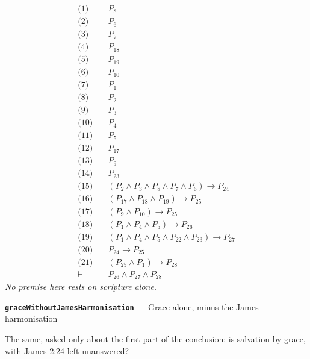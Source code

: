 \documentclass[11pt]{article}
\begin{document}
\begin{align*}
  \text{(1)} \quad & P_{8} \\
  \text{(2)} \quad & P_{6} \\
  \text{(3)} \quad & P_{7} \\
  \text{(4)} \quad & P_{18} \\
  \text{(5)} \quad & P_{19} \\
  \text{(6)} \quad & P_{10} \\
  \text{(7)} \quad & P_{1} \\
  \text{(8)} \quad & P_{2} \\
  \text{(9)} \quad & P_{3} \\
  \text{(10)} \quad & P_{4} \\
  \text{(11)} \quad & P_{5} \\
  \text{(12)} \quad & P_{17} \\
  \text{(13)} \quad & P_{9} \\
  \text{(14)} \quad & P_{23} \\
  \text{(15)} \quad & (P_{2} \land P_{3} \land P_{8} \land P_{7} \land P_{6}) \rightarrow P_{24} \\
  \text{(16)} \quad & (P_{17} \land P_{18} \land P_{19}) \rightarrow P_{25} \\
  \text{(17)} \quad & (P_{9} \land P_{10}) \rightarrow P_{25} \\
  \text{(18)} \quad & (P_{1} \land P_{4} \land P_{5}) \rightarrow P_{26} \\
  \text{(19)} \quad & (P_{1} \land P_{4} \land P_{5} \land P_{22} \land P_{23}) \rightarrow P_{27} \\
  \text{(20)} \quad & P_{24} \rightarrow P_{25} \\
  \text{(21)} \quad & (P_{25} \land P_{1}) \rightarrow P_{28} \\
  \vdash \quad & P_{26} \land P_{27} \land P_{28}
\end{align*}
\emph{No premise here rests on scripture alone.}
\par\medskip\noindent\textbf{\texttt{grace\allowbreak{}Without\allowbreak{}James\allowbreak{}Harmonisation}} --- Grace alone, minus the James harmonisation\par\nobreak\noindent
The same, asked only about the first part of the conclusion: is salvation by grace, with James 2:24 left unanswered?
\end{document}
